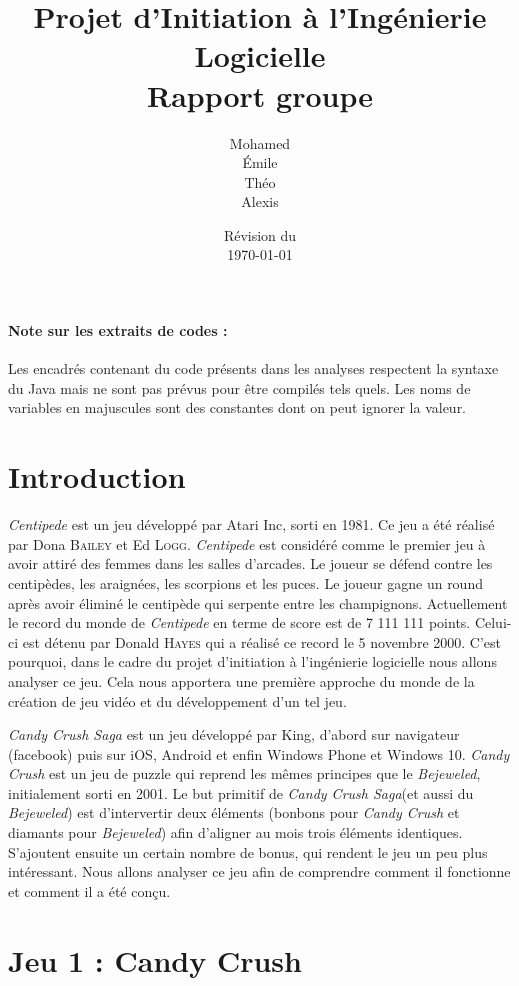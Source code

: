 \documentclass[a4paper, 12pt, oneside]{article}
\title{Projet d'Initiation à l'Ingénierie Logicielle\\Rapport groupe \no 3}
\author{Mohamed \bsc{Lakhal}\\Émile \bsc{Jeannin}\\Théo \bsc{Mottet}\\Alexis \bsc{Cabodi}}
\date{Révision du\\\today}
\newcommand{\oeuvre}[1]{\textit{#1}}
\newcommand{\Candy}{\oeuvre{Candy Crush}\xspace} %
\newcommand{\CandyS}{\oeuvre{Candy Crush Saga}\xspace}
\newcommand{\Centi}{\oeuvre{Centipede}\xspace}
\begin{document}
\maketitle
\newpage
\tableofcontents
\bigskip
\paragraph*{Note sur les extraits de codes :} Les encadrés contenant du code présents dans les analyses respectent la syntaxe du Java mais ne sont pas prévus pour être compilés tels quels. Les noms de variables en majuscules sont des constantes dont on peut ignorer la valeur.
\newpage

\section{Introduction}
\Centi est un jeu développé par Atari Inc, sorti en 1981. Ce jeu a été réalisé par Dona \textsc{Bailey} et Ed \textsc{Logg}. \Centi est considéré comme le premier jeu à avoir attiré des femmes dans les salles d'arcades. 
Le joueur se défend contre les centipèdes, les araignées, les scorpions et les puces. Le joueur gagne un round après avoir éliminé le centipède qui serpente entre les champignons. Actuellement le record du monde de \Centi en terme de score est de 7 111 111 points. Celui-ci est détenu par Donald \textsc{Hayes} qui a réalisé ce record le 5 novembre 2000. 
C'est pourquoi, dans le cadre du projet d'initiation à l'ingénierie logicielle nous allons analyser ce jeu. Cela nous apportera une première approche du monde de la création de jeu vidéo et du développement d'un tel jeu. 

\CandyS est un jeu développé par King, d'abord sur navigateur (facebook) puis sur iOS, Android et enfin Windows Phone et Windows 10. \Candy est un jeu de puzzle qui reprend les mêmes principes que le \oeuvre{Bejeweled}, initialement sorti en 2001. Le but primitif de \CandyS (et aussi du \oeuvre{Bejeweled}) est d'intervertir deux éléments (bonbons pour \Candy et diamants pour \oeuvre{Bejeweled}) afin d'aligner au mois trois éléments identiques. S'ajoutent ensuite un certain nombre de bonus, qui rendent le jeu un peu plus intéressant. Nous allons analyser ce jeu afin de comprendre comment il fonctionne et comment il a été conçu.

\section{Jeu 1 : Candy Crush}

\end{document}
